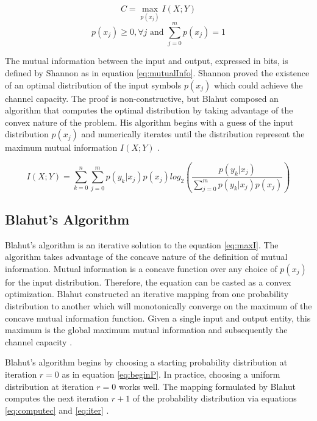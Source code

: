 \documentclass[journal]{IEEEtran}
\begin{document}
\begin{equation}
\label{eq:maxI}
C = \max_{p(x_j)}I(X;Y)
\end{equation}
\begin{equation}
p(x_j) \geq 0, \forall j \text{ and } \sum_{j=0}^{m}p(x_j) = 1
\end{equation}

\par The mutual information between the input and output, expressed in bits, is defined by Shannon as in equation \ref{eq:mutualInfo}. Shannon proved the existence of an optimal distribution of the input symbols \begin{math}p(x_j)\end{math} which could achieve the channel capacity. The proof is non-constructive, but Blahut composed an algorithm that computes the optimal distribution by taking advantage of the convex nature of the problem. His algorithm begins with a guess of the input distribution \(p(x_j)\) and numerically iterates until the distribution represent the maximum mutual information \(I(X;Y)\) \cite{blahut}.

\begin{equation}
\label{eq:mutualInfo}
I(X;Y) = \sum_{k=0}^{n}\sum_{j=0}^{m}p(y_k|x_j)p(x_j)log_{2}\left(\frac{p(y_k|x_j)}{\sum_{j=0}^{m}p(y_k|x_j)p(x_j)}\right)
\end{equation}

\subsection{Blahut's Algorithm}
\par Blahut's algorithm is an iterative solution to the equation \ref{eq:maxI}. The algorithm takes advantage of the concave nature of the definition of mutual information. Mutual information is a concave function over any choice of \begin{math}p(x_j)\end{math} for the input distribution. Therefore, the equation can be casted as a convex optimization. Blahut constructed an iterative mapping from one probability distribution to another which will monotonically converge on the maximum of the concave mutual information function. Given a single input and output entity, this maximum is the global maximum mutual information and subsequently the channel capacity \cite{blahut}.
\par Blahut's algorithm begins by choosing a starting probability distribution at iteration \begin{math}r = 0\end{math} as in equation \ref{eq:beginP}. In practice, choosing a uniform distribution at iteration \begin{math}r = 0\end{math} works well. The mapping formulated by Blahut computes the next iteration \begin{math} r+1 \end{math} of the probability distribution via equations \ref{eq:computec} and \ref{eq:iter} \cite{blahut}.
\end{document}
